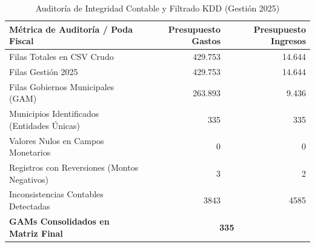 \begin{table}[htbp]
\centering
\small
\caption{Auditor\'ia de Integridad Contable y Filtrado KDD (Gesti\'on 2025)}
\label{tab:auditoria_limpieza}
\begin{tabular}{lrr}
\hline
\textbf{M\'etrica de Auditor\'ia / Poda Fiscal} & \textbf{Presupuesto Gastos} & \textbf{Presupuesto Ingresos} \\
\hline
Filas Totales en CSV Crudo & 429.753 & 14.644 \\
Filas Gesti\'on 2025 & 429.753 & 14.644 \\
Filas Gobiernos Municipales (GAM) & 263.893 & 9.436 \\
Municipios Identificados (Entidades \'Unicas) & 335 & 335 \\
Valores Nulos en Campos Monetarios & 0 & 0 \\
Registros con Reversiones (Montos Negativos) & 3 & 2 \\
Inconsistencias Contables Detectadas & 3843 & 4585 \\
\textbf{GAMs Consolidados en Matriz Final} & \multicolumn{2}{c}{\textbf{335}} \\
\hline
\end{tabular}
\end{table}
